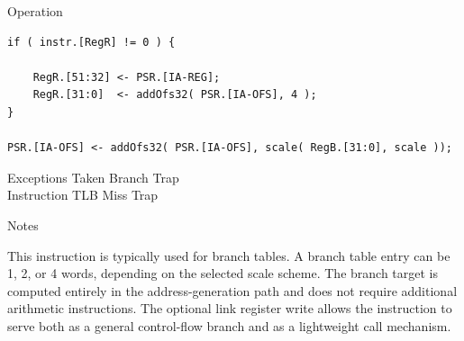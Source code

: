 \begin{iPageDescOpEntry}{Operation}
\begin{lstlisting}[style=iPageOpStyle]
if ( instr.[RegR] != 0 ) {

    RegR.[51:32] <- PSR.[IA-REG];
    RegR.[31:0]  <- addOfs32( PSR.[IA-OFS], 4 );
}

PSR.[IA-OFS] <- addOfs32( PSR.[IA-OFS], scale( RegB.[31:0], scale ));
\end{lstlisting}
\end{iPageDescOpEntry}

\begin{iPageDescEntry}{Exceptions}
Taken Branch Trap \\
Instruction TLB Miss Trap
\end{iPageDescEntry}

\begin{iPageDescEntry}{Notes}

This instruction is typically used for branch tables. A branch table entry can be 1, 2, or 4 words, depending on the selected scale scheme. The branch target is computed entirely in the address-generation path and does not require additional arithmetic instructions. The optional link register write allows the instruction to serve both as a general control-flow branch and as a lightweight call mechanism.
\end{iPageDescEntry}